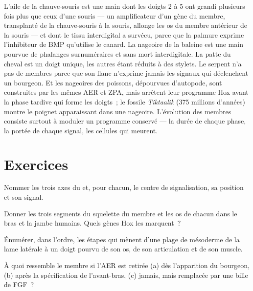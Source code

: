 \begin{example}\label{ex:b2:limb-organogenesis:evolution}
L'aile de la chauve-souris est une main dont les doigts 2 à 5 ont grandi
plusieurs fois plus que ceux d'une souris --- un amplificateur d'un
gène du membre, transplanté de la chauve-souris à la souris, allonge les
os du membre antérieur de la souris --- et dont le tissu interdigital a
survécu, parce que la palmure exprime l'inhibiteur de BMP qu'utilise le
canard. La nageoire de la baleine est une main pourvue de phalanges
surnuméraires et sans mort interdigitale. La patte du cheval est un
doigt unique, les autres étant réduits à des stylets. Le serpent n'a pas
de membres parce que son flanc n'exprime jamais les signaux qui
déclenchent un bourgeon. Et les nageoires des poissons, dépourvues
d'autopode, sont construites par les mêmes AER et ZPA, mais arrêtent
leur programme Hox avant la phase tardive qui forme les doigts~; le
fossile \emph{Tiktaalik} (375 millions d'années) montre le poignet
apparaissant dans une nageoire. L'évolution des membres consiste
surtout à moduler un programme conservé --- la durée de chaque phase, la
portée de chaque signal, les cellules qui meurent.
\end{example}

\section{Exercices}

\begin{exercise}[$\star$]\label{exo:b2:limb-organogenesis:1}
Nommer les trois axes du  et, pour chacun, le centre
de signalisation, sa position et son signal.
\end{exercise}

\begin{exercise}[$\star$]\label{exo:b2:limb-organogenesis:2}
Donner les trois segments du squelette du membre et les os de chacun
dans le bras et la jambe humains. Quels gènes Hox les marquent~?
\end{exercise}

\begin{exercise}[$\star$]\label{exo:b2:limb-organogenesis:3}
Énumérer, dans l'ordre, les étapes qui mènent d'une plage de mésoderme
de la lame latérale à un doigt pourvu de son os, de son articulation et
de son muscle.
\end{exercise}

\begin{exercise}[$\star$]\label{exo:b2:limb-organogenesis:4}
À quoi ressemble le membre si l'AER est retirée (a) dès l'apparition du
bourgeon, (b) après la spécification de l'avant-bras, (c) jamais, mais
remplacée par une bille de FGF~?
\end{exercise}

